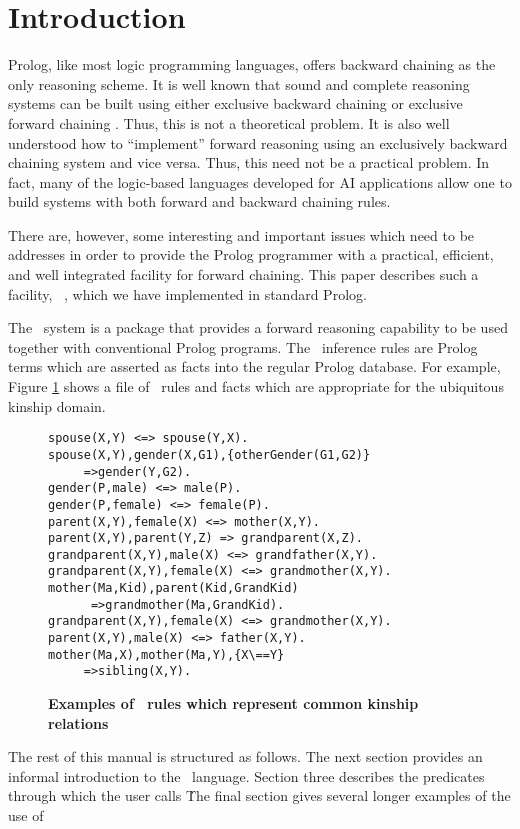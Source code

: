 \section{Introduction}

Prolog, like most logic programming languages, offers backward
chaining as the only reasoning scheme.  It is well known that sound
and complete reasoning systems can be built using either exclusive
backward chaining or exclusive forward chaining \cite{Nilsson80}.
Thus, this is not a theoretical problem.  It is also well understood
how to ``implement'' forward reasoning using an exclusively backward
chaining system and vice versa.  Thus, this need not be a practical
problem.  In fact, many of the logic-based languages developed for AI
applications \cite{DUCK,MRS,Petrie88,Fritzson88a} allow one to build
systems with both forward and backward chaining rules.

There are, however, some interesting and important issues which need
to be addresses in order to provide the Prolog programmer with a
practical, efficient, and well integrated facility for forward
chaining.  This paper describes such a facility, \pfc\ , which we have
implemented in standard Prolog.

The \pfc\ system is a package that provides a forward reasoning
capability to be used together with conventional Prolog programs.  The
\pfc\ inference rules are Prolog terms which are asserted as facts
into the regular Prolog database.  For example, Figure
\ref{fig:pfcrules} shows a file of \pfc\ rules and facts which are
appropriate for the ubiquitous kinship domain.

\begin{figure}[bhp]
\figline
\small
\begin{verbatim}
spouse(X,Y) <=> spouse(Y,X).
spouse(X,Y),gender(X,G1),{otherGender(G1,G2)}
     =>gender(Y,G2).
gender(P,male) <=> male(P).
gender(P,female) <=> female(P).
parent(X,Y),female(X) <=> mother(X,Y).
parent(X,Y),parent(Y,Z) => grandparent(X,Z).
grandparent(X,Y),male(X) <=> grandfather(X,Y).
grandparent(X,Y),female(X) <=> grandmother(X,Y).
mother(Ma,Kid),parent(Kid,GrandKid)
      =>grandmother(Ma,GrandKid).
grandparent(X,Y),female(X) <=> grandmother(X,Y).
parent(X,Y),male(X) <=> father(X,Y).
mother(Ma,X),mother(Ma,Y),{X\==Y}
     =>sibling(X,Y).
\end{verbatim}
\caption[Pfc Rules]{{\bf Examples of \pfc\ rules which represent common kinship relations}}
\label{fig:pfcrules}
\figline
\end{figure}

The rest of this manual is structured as follows.  The next section
provides an informal introduction to the \pfc\ language.  Section
three describes the predicates through which the user calls \pfc\.
The final section gives several longer examples of the use of \pfc\

